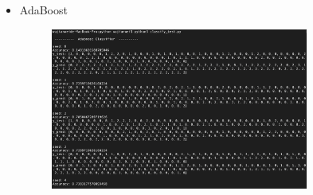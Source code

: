 \begin{itemize}
\begin{figure}[H]
	\end{figure}
	\item AdaBoost\\
	\begin{figure}[H]
		\centering
		\includegraphics[width=0.8\textwidth]{../../pic/Adaboost.png}
	\end{figure}
\end{itemize}


